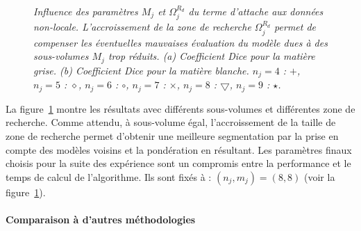 \begin{figure}[!thbp]

        \begin{center}
        \end{center}

        \caption{\emph{Influence des paramètres $M_j$ et $\Omega^{R_d}_j$ du terme d'attache aux données non-locale. L'accroissement de la zone de recherche $\Omega^{R_d}_{j}$ permet de compenser les éventuelles mauvaises évaluation du modèle dues à des sous-volumes $M_j$ trop réduits. (a) Coefficient Dice pour la matière grise. (b) Coefficient Dice pour la matière blanche. $n_j = 4$ : $+$, $n_j = 5$ : $\diamond$, $n_j = 6$ : $\circ$, $n_j = 7$ : $\times$, $n_j = 8$ : $\bigtriangledown$, $n_j = 9$ : $\star$.}}

        \label{FIG:PARAM:BRAINWEB:BIAS}

\end{figure}

La figure~\ref{FIG:PARAM:BRAINWEB:BIAS} montre les résultats avec différents sous-volumes et différentes zone de recherche.
Comme attendu, à sous-volume égal, l'accroissement de la taille de zone de recherche permet d'obtenir une meilleure segmentation par la prise en compte des modèles voisins et la pondération en résultant.
Les paramètres finaux choisis pour la suite des expérience sont un compromis entre la performance et le temps de calcul de l'algorithme.
Ils sont fixés à : $(n_j, m_j) = (8, 8)$ (voir la figure~\ref{FIG:PARAM:BRAINWEB:BIAS}).

\paragraph*{Comparaison à d'autres méthodologies}

